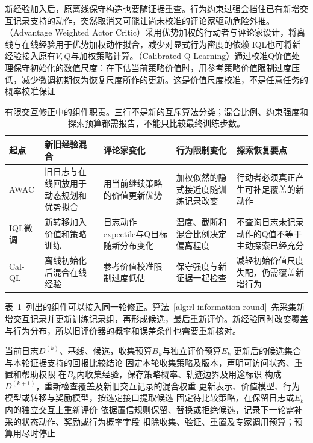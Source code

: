 新经验加入后，原离线保守构造也要随证据重查。行为约束过强会挡住已有新增交互记录支持的动作，突然取消又可能让尚未校准的评论家驱动危险外推。（Advantage Weighted Actor Critic）采用优势加权的行动者与评论家设计，将离线与在线经验用于优势加权动作拟合，减少对显式行为密度的依赖
IQL也可将新经验接入原有$V,Q$与加权策略计算。（Calibrated Q-Learning）通过校准Q价值处理保守初始化的数值尺度：在下估当前策略价值时，用参考策略价值限制过度压低，减少微调初期仅为恢复尺度所作的更新。这是价值尺度校准，不是任意任务的概率校准保证

\begin{table}[t]
  \centering
  \small
  \begin{tabularx}{\linewidth}{p{18mm}XXXX}
    \toprule
    起点 & 新旧经验混合 & 评论家变化 & 行为限制变化 & 探索恢复要点 \\
    \midrule
    AWAC & 旧日志与在线回放用于动态规划和优势拟合 & 用当前继续策略的价值更新优势 & 加权似然的隐式接近度随训练记录改变 & 行动者必须真正产生可补足覆盖的新动作 \\
    IQL微调 & 新转移加入价值和策略训练 & 日志动作expectile与Q目标随新分布变化 & 温度、截断和混合比例决定偏离程度 & 不查询日志未记录动作的Q值不等于主动探索已经充分 \\
    Cal-QL & 离线初始化后混合在线经验 & 参考价值校准限制过度低估 & 保守强度与新证据一起检查 & 减轻初始价值尺度失配，仍需覆盖新增行为 \\
    \bottomrule
  \end{tabularx}
  \caption{有限交互修正中的组件职责。三行不是新的互斥算法分类；混合比例、约束强度和探索预算都需报告，不能只比较最终训练步数。}
  \label{tab:rl-information-finetuning}
\end{table}

表~\ref{tab:rl-information-finetuning}~列出的组件可以接入同一轮修正。算法~\ref{alg:rl-information-round}~先采集新增交互记录并更新训练记录组，再形成候选，最后重新评价。新经验同时改变覆盖与行为分布，所以旧评价器的概率和误差条件也需要重新核对。

\begin{algorithm}[一轮有限经验修正]
  \label{alg:rl-information-round}
  \begin{algorithmic}[1]
    \Require 当前日志$D^{(k)}$、基线、候选，收集预算$B_k$与独立评价预算$E_k$
    \Ensure 更新后的候选集合与本轮证据支持的回报比较结论
    \State 固定本轮收集策略及版本，声明可访问状态、重置和帮助权限
    \State 在$B_k$内收集经验，保存策略概率、轨迹边界及用途标识
    \State 构成$D^{(k+1)}$，重新检查覆盖及新旧交互记录的混合权重
    \State 更新表示、价值模型、行为模型或转移与奖励模型，按选定接口提取候选
    \State 固定待比较策略，在保留日志或$E_k$内的独立交互上重新评价
    \State 依据置信规则保留、替换或拒绝候选，记录下一轮需补采的状态动作、奖励或行为概率字段
    \State 扣除收集、验证、重置及专家调用预算；预算用尽时停止
  \end{algorithmic}
\end{algorithm}

